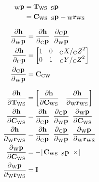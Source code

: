 \begin{align}
  \Point{\world}{\fiducial_{ij}}
  &=
    \Tf{\world}{\sensor}
    \enspace \Pt{\sensor} \\
  &=
    \Rot{\world}{\sensor}
    \enspace \Pt{\sensor}
		+ \Pos{\world}{\sensor}
\end{align}

\begin{align}
  \dfrac{\partial{\projFunc}}{\partial{\Pt{\world}}}
		&= \dfrac{\partial{\projFunc}}{\partial{\Pt{\cam}}}
			 \enspace
			 \dfrac{\partial{\Pt{\cam}}}{\partial{\Pt{\world}}} \\
  \dfrac{\partial{\projFunc}}{\partial{\Pt{\cam}}}
		&=
			\begin{bmatrix}
				1 & 0 & \KineNotationBare{X}{\cam} / \KineNotationBare{Z}{\cam}^{2} \\
				0 & 1 & \KineNotationBare{Y}{\cam} / \KineNotationBare{Z}{\cam}^{2}
			\end{bmatrix} \\
  \dfrac{\partial{\Pt{\cam}}}{\partial{\Pt{\world}}}
		&= \Rot{\cam}{\world}
\end{align}

\begin{align}
  \dfrac{\partial{\projFunc}}{\partial{\Tf{\world}{\sensor}}}
    &=
		\begin{bmatrix}
			\dfrac{\partial{\projFunc}}{\partial{\Rot{\world}{\sensor}}}
			\quad
			\dfrac{\partial{\projFunc}}{\partial{\Pos{\world}{\sensor}}}
		\end{bmatrix} \\
  \dfrac{\partial{\projFunc}}{\partial{\Rot{\world}{\sensor}}}
    &= \dfrac{\partial{\projFunc}}{\partial{\Pt{\cam}}}
			 \enspace
       \dfrac{\partial{\Pt{\cam}}}{\partial{\Pt{\world}}}
			 \enspace
       \dfrac{\partial{\Pt{\world}}}{\partial{\Rot{\world}{\sensor}}} \\
  \dfrac{\partial{\projFunc}}{\partial{\Pos{\world}{\sensor}}}
    &= \dfrac{\partial{\projFunc}}{\partial{\Pt{\cam}}}
			 \enspace
       \dfrac{\partial{\Pt{\cam}}}{\partial{\Pt{\world}}}
			 \enspace
       \dfrac{\partial{\Pt{\world}}}{\partial{\Pos{\world}{\sensor}}} \\
	\dfrac{\partial{\Pt{\world}}}{\partial{\Rot{\world}{\sensor}}}
		&= -\Skew{\Rot{\world}{\sensor} \enspace \Pt{\sensor}} \\
	\dfrac{\partial{\Pt{\world}}}{\partial{\Pos{\world}{\sensor}}}
		&= \I
\end{align}



